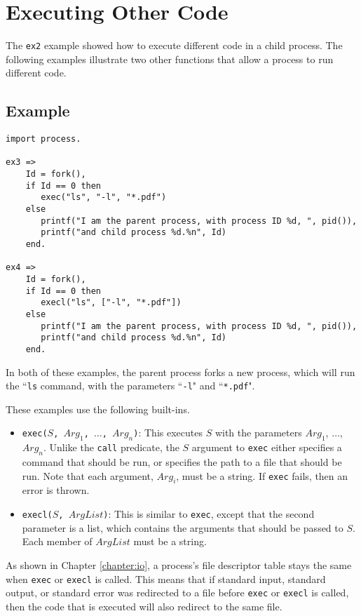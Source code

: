\section{\label{execute}Executing Other Code}
The \texttt{ex2} example showed how to execute different code in a child process.  The following examples illustrate two other functions that allow a process to run different code.

\subsection*{Example}
\begin{verbatim}
import process.

ex3 =>
    Id = fork(),
    if Id == 0 then
       exec("ls", "-l", "*.pdf")
    else
       printf("I am the parent process, with process ID %d, ", pid()),
       printf("and child process %d.%n", Id)
    end.

ex4 =>
    Id = fork(),
    if Id == 0 then
       execl("ls", ["-l", "*.pdf"])
    else
       printf("I am the parent process, with process ID %d, ", pid()),
       printf("and child process %d.%n", Id)
    end.
\end{verbatim}

In both of these examples, the parent process forks a new process, which will run the ``\texttt{ls} command, with the parameters ``\texttt{-l}" and ``\texttt{*.pdf}".

These examples use the following built-ins.
\begin{itemize}
\item \texttt{exec($S$, $Arg_1$, $\ldots$, $Arg_n$)}: This executes $S$ with the parameters $Arg_1$, $\ldots$, $Arg_n$.  Unlike the \texttt{call} predicate, the $S$ argument to \texttt{exec} either specifies a command that should be run, or specifies the path to a file that should be run.  Note that each argument, $Arg_i$, must be a string.  If \texttt{exec} fails, then an error is thrown.
\item \texttt{execl($S$, $ArgList$)}: This is similar to \texttt{exec}, except that the second parameter is a list, which contains the arguments that should be passed to $S$.  Each member of $ArgList$ must be a string.
\end{itemize}

As shown in Chapter \ref{chapter:io}, a process's file descriptor table stays the same when \texttt{exec} or \texttt{execl} is called.  This means that if standard input, standard output, or standard error was redirected to a file before \texttt{exec} or \texttt{execl} is called, then the code that is executed will also redirect to the same file.

